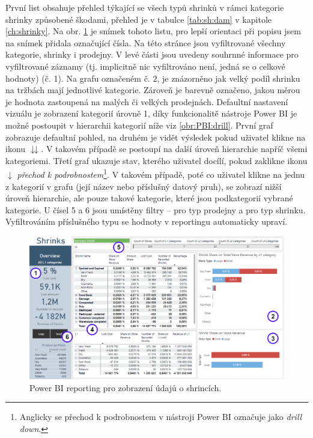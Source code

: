 První list obsahuje přehled týkající se všech typů shrinků v rámci kategorie shrinky způsobené škodami, přehled je v tabulce \ref*{tab:sh:dam} v kapitole \ref*{ch:shrinky}. Na obr. \ref*{obr:PBI:overview} je snímek tohoto listu, pro lepší orientaci při popisu jsem na snímek přidala označující čísla. Na této stránce jsou vyfiltrované všechny kategorie, shrinky i prodejny. V levé části jsou uvedeny souhrnné informace pro vyfiltrované záznamy (tj. implicitně nic vyfiltrováno není, jedná se o celkové hodnoty) (č. 1). 
Na grafu označeném č. 2, je znázorněno jak velký podíl shrinku na tržbách mají jednotlivé kategorie. Zároveň je barevně označeno, jakou měrou je hodnota zastoupená na malých či velkých prodejnách. Defaultní nastavení vizuálu je zobrazení kategorií úrovně 1, díky funkcionalitě nástroje Power BI je možné postoupit v hierarchii kategorií níže viz \ref*{obr:PBI:drill}. První graf zobrazuje defaultní pohled, na druhém je vidět výsledek pokud uživatel klikne na ikonu $\downdownarrows$. V takovém případě se postoupí na další úroveň hierarchie napříč všemi kategoriemi. Třetí graf ukazuje stav, kterého uživatel docílí, pokud zaklikne ikonu $\downarrow$ \emph{přechod k podrobnostem}\footnote{Anglicky se přechod k podrobnostem v nástroji Power BI označuje jako \emph{drill down}.}. V takovém případě, poté co uživatel klikne na jednu z kategorií v grafu (její název nebo příslušný datový pruh), se zobrazí nižší úroveň hierarchie, ale pouze takové kategorie, které jsou podkategorií vybrané kategorie. 
U čísel 5 a 6 jsou umístěny filtry -- pro typ prodejny a pro typ shrinku. Vyfiltrováním příslušného typu se hodnoty v reportingu automaticky upraví. 

\begin{figure}[hbtp!]
    \centering
    \captionsetup{justification=centering}
    \includegraphics[width=\textwidth]{obrazky/PBI/overview.png}
    \caption{Power BI reporting pro zobrazení údajů o shrincích.}
    \label{obr:PBI:overview}


\end{figure}

